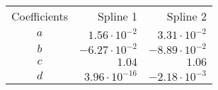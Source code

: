\begin{tabular}{crr}
    \toprule
    Coefficients & Spline 1 & Spline 2 \\ \otoprule
    $a$ & $1.56 \cdot 10^{-2}$ & $3.31 \cdot 10^{-2}$ \\
    $b$ & $-6.27 \cdot 10^{-2}$ & $-8.89 \cdot 10^{-2}$ \\
    $c$ & $1.04$ & $1.06$ \\
    $d$ & $3.96 \cdot 10^{-16}$ & $-2.18 \cdot 10^{-3}$ \\
    \bottomrule
\end{tabular}
